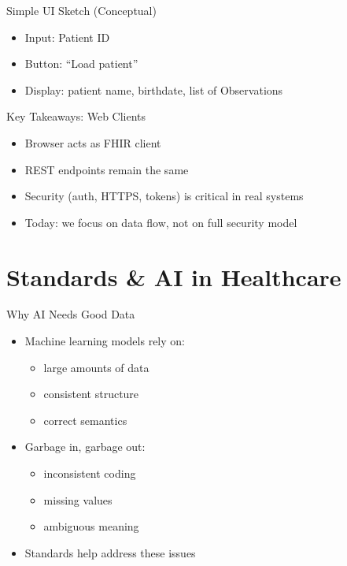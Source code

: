\documentclass[aspectratio=1610]{beamer}
\begin{document}
	\begin{frame}[fragile]{Simple UI Sketch (Conceptual)}
		\begin{itemize}
			\item Input: Patient ID
			\item Button: ``Load patient''
			\item Display: patient name, birthdate, list of Observations
		\end{itemize}
	\end{frame}
	
	\begin{frame}{Key Takeaways: Web Clients}
		\begin{itemize}
			\item Browser acts as FHIR client
			\item REST endpoints remain the same
			\item Security (auth, HTTPS, tokens) is critical in real systems
			\item Today: we focus on data flow, not on full security model
		\end{itemize}
	\end{frame}
	
	\section{Standards \& AI in Healthcare}
	
	\begin{frame}{Why AI Needs Good Data}
		\begin{itemize}
			\item Machine learning models rely on:
			\begin{itemize}
				\item large amounts of data
				\item consistent structure
				\item correct semantics
			\end{itemize}
			\item Garbage in, garbage out:
			\begin{itemize}
				\item inconsistent coding
				\item missing values
				\item ambiguous meaning
			\end{itemize}
			\item Standards help address these issues
		\end{itemize}
	\end{frame}
	
\end{document}

